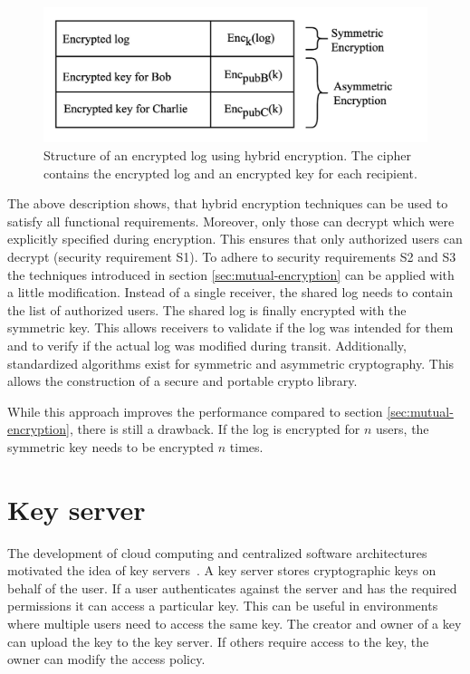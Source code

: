 \documentclass[../main.tex]{subfiles}
\begin{document}
\begin{figure}[ht]
    \includegraphics[scale=0.22]{../img/04/hybrid_encryption.jpg}
    \centering
    \caption[Structure encrypted log]{Structure of an encrypted log using hybrid encryption. The cipher contains the encrypted log and an encrypted key for each recipient.}
    \label{fig:hybrid_encryption}
\end{figure}

The above description shows, that hybrid encryption techniques can be used to satisfy all functional requirements.
Moreover, only those can decrypt which were explicitly specified during encryption.
This ensures that only authorized users can decrypt (security requirement S1).
To adhere to security requirements S2 and S3 the techniques introduced in section \ref{sec:mutual-encryption} can be applied with a little modification.
Instead of a single receiver, the shared log needs to contain the list of authorized users.
The shared log is finally encrypted with the symmetric key.
This allows receivers to validate if the log was intended for them and to verify if the actual log was modified during transit.
Additionally, standardized algorithms exist for symmetric and asymmetric cryptography.
This allows the construction of a secure and portable crypto library.

While this approach improves the performance compared to section \ref{sec:mutual-encryption}, there is still a drawback.
If the log is encrypted for $n$ users, the symmetric key needs to be encrypted $n$ times.

\section{Key server}
\label{sec:key-server}

The development of cloud computing and centralized software architectures motivated the idea of key servers~\cite{Seitz2003}.
A key server stores cryptographic keys on behalf of the user.
If a user authenticates against the server and has the required permissions it can access a particular key.
This can be useful in environments where multiple users need to access the same key.
The creator and owner of a key can upload the key to the key server.
If others require access to the key, the owner can modify the access policy.
\end{document}
